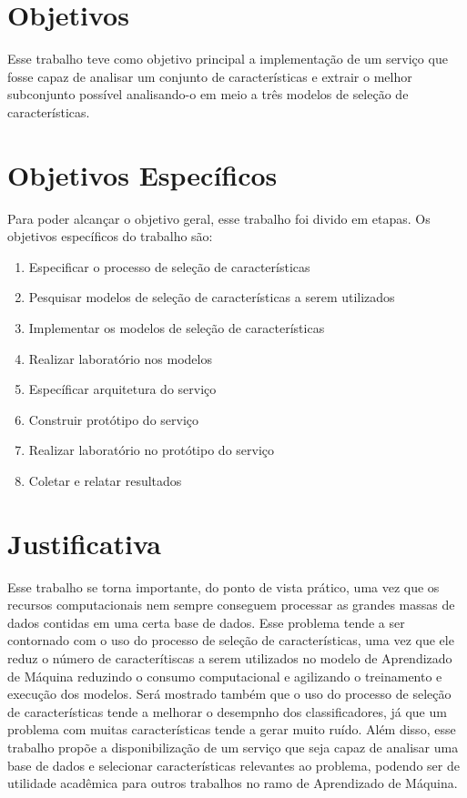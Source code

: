 \section{Objetivos}

Esse trabalho teve como objetivo principal a implementação de um serviço que fosse capaz de analisar um conjunto de características e extrair o melhor subconjunto possível analisando-o em meio a três modelos de seleção de características.

\section{Objetivos Específicos}

Para poder alcançar o objetivo geral, esse trabalho foi divido em etapas. Os objetivos específicos do trabalho são:

\begin{enumerate}
	\item{Especificar o processo de seleção de características}
	\item{Pesquisar modelos de seleção de características a serem utilizados}
	\item{Implementar os modelos de seleção de características}
	\item{Realizar laboratório nos modelos}
	\item{Específicar arquitetura do serviço}
	\item{Construir protótipo do serviço}
	\item{Realizar laboratório no protótipo do serviço}
	\item{Coletar e relatar resultados}
\end{enumerate}


\section{Justificativa}

Esse trabalho se torna importante, do ponto de vista prático, uma vez que os recursos computacionais nem sempre conseguem processar as grandes massas de dados contidas em uma certa base de dados. Esse problema tende a ser contornado com o uso do processo de seleção de características, uma vez que ele reduz o número de caracterítiscas a serem utilizados no modelo de Aprendizado de Máquina reduzindo o consumo computacional e agilizando o treinamento e execução dos modelos. Será mostrado também que o uso do processo de seleção de características tende a melhorar o desempnho dos classificadores, já que um problema com muitas características tende a gerar muito ruído. Além disso, esse trabalho propõe a disponibilização de um serviço que seja capaz de analisar uma base de dados e selecionar características relevantes ao problema, podendo ser de utilidade acadêmica para outros trabalhos no ramo de Aprendizado de Máquina.

